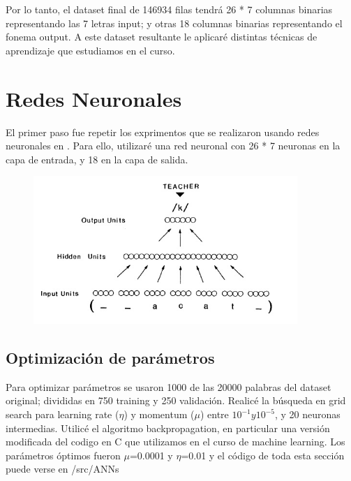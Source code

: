 \documentclass[paper=a4, fontsize=11pt]{scrartcl} %
\numberwithin{equation}{section} %
\numberwithin{figure}{section} %
\numberwithin{table}{section} %
\begin{document}
Por lo tanto, el dataset final de 146934 filas tendrá 26 * 7 columnas binarias representando las 7 letras input; y otras 18 columnas binarias representando el fonema output. A este dataset resultante le aplicaré distintas técnicas de aprendizaje que estudiamos en el curso.

\section{Redes Neuronales}
El primer paso fue repetir los exprimentos que se realizaron usando redes neuronales en \cite{parallel}. Para ello, utilizaré una red neuronal con 26 * 7 neuronas en la capa de entrada, y 18 en la capa de salida. 

\begin{figure}[h!]
\centering
\includegraphics[width=100mm]{figure1.jpg}
\end{figure}

\subsection{Optimización de parámetros}

Para optimizar parámetros se usaron 1000 de las 20000 palabras del dataset original; divididas en 750 training y 250 validación. Realicé la búsqueda en grid search para learning rate ($\eta$) y momentum ($\mu$) entre  $10^{-1} y 10^{-5}$, y 20 neuronas intermedias. Utilicé el algoritmo backpropagation, en particular una versión modificada del codigo en C que utilizamos en el curso de machine learning. Los parámetros óptimos fueron $\mu$=0.0001 y $\eta$=0.01 y el código de toda esta sección puede verse en /src/ANNs

\end{document}
